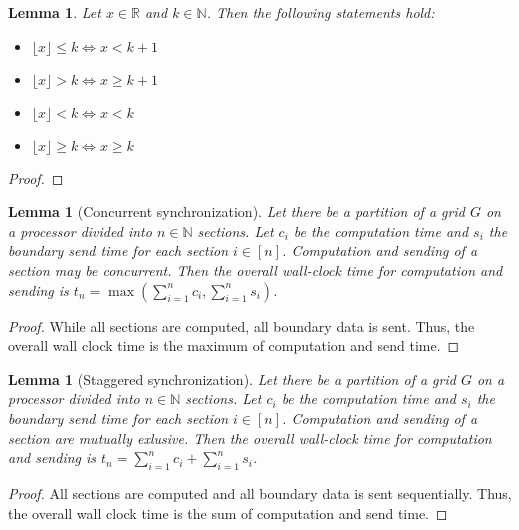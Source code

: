 \documentclass{IOS-Book-Article}
\theoremstyle{plain}
\newtheorem{lemma}[theorem]{Lemma}
\theoremstyle{definition}
\begin{document}
\begin{lemma} Let $x \in \mathbb R$ and $k \in \mathbb N$. Then the following statements hold:
	\begin{itemize}
		\item $\lfloor x \rfloor \leq k \Leftrightarrow x < k + 1$
		\item $\lfloor x \rfloor > k \Leftrightarrow x \geq k + 1$
		\item $\lfloor x \rfloor < k \Leftrightarrow x < k$
		\item $\lfloor x \rfloor \geq k \Leftrightarrow x \geq k$
	\end{itemize}
\end{lemma}

\begin{proof}
	
\end{proof}

\begin{lemma}[Concurrent synchronization]
	Let there be a partition of a grid $G$ on a processor divided into $n \in \mathbb N$ sections. Let $c_i$ be the computation time and $s_i$ the boundary send time for each section $i \in [n]$. Computation and sending of a section may be concurrent. Then the overall wall-clock time for computation and sending is $t_n = \max \left( \sum \limits_{i = 1}^{n} c_i, \sum \limits_{i = 1}^{n} s_i \right)$.
\end{lemma}

\begin{proof}
	While all sections are computed, all boundary data is sent. Thus, the overall wall clock time is the maximum of computation and send time.
\end{proof}

\begin{lemma}[Staggered synchronization]
	Let there be a partition of a grid $G$ on a processor divided into $n \in \mathbb N$ sections. Let $c_i$ be the computation time and $s_i$ the boundary send time for each section $i \in [n]$. Computation and sending of a section are mutually exlusive. Then the overall wall-clock time for computation and sending is $t_n = \sum \limits_{i = 1}^{n} c_i + \sum \limits_{i = 1}^{n} s_i$.
\end{lemma}

\begin{proof}
	All sections are computed and all boundary data is sent sequentially. Thus, the overall wall clock time is the sum of computation and send time.
\end{proof}
\end{document}
